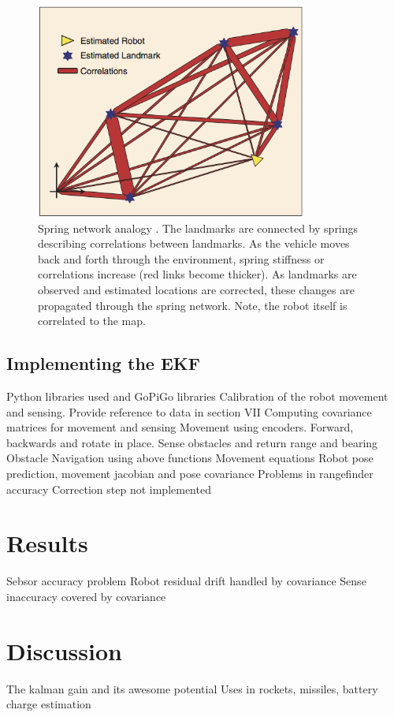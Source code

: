 \documentclass[conference]{IEEEtran}
\begin{document}
\begin{figure}[!t]
\centering
\includegraphics[width=3.5in]{./figures/SpringSlam.png}
\caption{Spring network analogy \cite{slam1}. The landmarks are connected by springs describing correlations between landmarks. As the vehicle moves back and forth through the environment, spring stiffness or correlations increase (red links become thicker). As landmarks are observed and estimated locations are corrected, these changes are propagated through the spring network. Note, the robot itself is correlated to the map.}
\label{SpringSlam}
\end{figure}

\subsection{Implementing the EKF}

Python libraries used and GoPiGo libraries
Calibration of the robot movement and sensing. Provide reference to data in section VII
Computing covariance matrices for movement and sensing
Movement using encoders. Forward, backwards and rotate in place.
Sense obstacles and return range and bearing
Obstacle Navigation using above functions
Movement equations
Robot pose prediction, movement jacobian and pose covariance
Problems in rangefinder accuracy
Correction step not implemented

\section{Results}
Sebsor accuracy problem
Robot residual drift handled by covariance
Sense inaccuracy covered by covariance

\section{Discussion}
The kalman gain and its awesome potential
Uses in rockets, missiles, battery charge estimation
\end{document}
